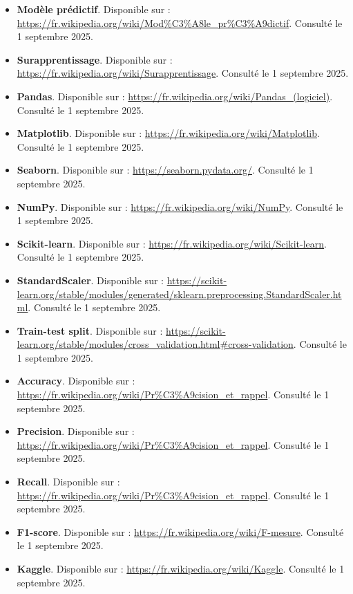 \begin{itemize}
	\item \textbf{Modèle prédictif}. Disponible sur : \url{https://fr.wikipedia.org/wiki/Mod%C3%A8le_pr%C3%A9dictif}. Consulté le 1 septembre 2025.
	
	\item \textbf{Surapprentissage}. Disponible sur : \url{https://fr.wikipedia.org/wiki/Surapprentissage}. Consulté le 1 septembre 2025.
	
	\item \textbf{Pandas}. Disponible sur : \url{https://fr.wikipedia.org/wiki/Pandas_(logiciel)}. Consulté le 1 septembre 2025.
	
	\item \textbf{Matplotlib}. Disponible sur : \url{https://fr.wikipedia.org/wiki/Matplotlib}. Consulté le 1 septembre 2025.
	
	\item \textbf{Seaborn}. Disponible sur : \url{https://seaborn.pydata.org/}. Consulté le 1 septembre 2025.
	
	\item \textbf{NumPy}. Disponible sur : \url{https://fr.wikipedia.org/wiki/NumPy}. Consulté le 1 septembre 2025.
	
	\item \textbf{Scikit-learn}. Disponible sur : \url{https://fr.wikipedia.org/wiki/Scikit-learn}. Consulté le 1 septembre 2025.
	
	\item \textbf{StandardScaler}. Disponible sur : \url{https://scikit-learn.org/stable/modules/generated/sklearn.preprocessing.StandardScaler.html}. Consulté le 1 septembre 2025.
	
	\item \textbf{Train-test split}. Disponible sur : \url{https://scikit-learn.org/stable/modules/cross_validation.html#cross-validation}. Consulté le 1 septembre 2025.
	
	\item \textbf{Accuracy}. Disponible sur : \url{https://fr.wikipedia.org/wiki/Pr%C3%A9cision_et_rappel}. Consulté le 1 septembre 2025.
	
	\item \textbf{Precision}. Disponible sur : \url{https://fr.wikipedia.org/wiki/Pr%C3%A9cision_et_rappel}. Consulté le 1 septembre 2025.
	
	\item \textbf{Recall}. Disponible sur : \url{https://fr.wikipedia.org/wiki/Pr%C3%A9cision_et_rappel}. Consulté le 1 septembre 2025.
	
	\item \textbf{F1-score}. Disponible sur : \url{https://fr.wikipedia.org/wiki/F-mesure}. Consulté le 1 septembre 2025.
	
	\item \textbf{Kaggle}. Disponible sur : \url{https://fr.wikipedia.org/wiki/Kaggle}. Consulté le 1 septembre 2025.
\end{itemize}
